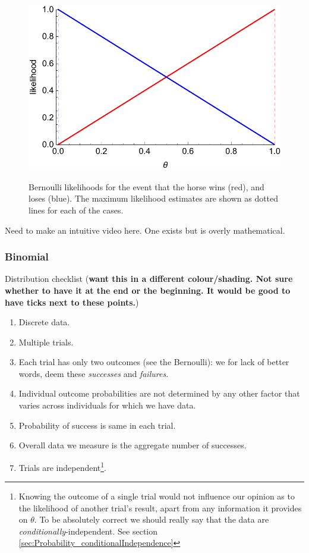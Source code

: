 \documentclass[11pt,fullpage]{book}
\begin{document}
\begin{figure}
\centering
\scalebox{0.5} 
{\includegraphics{Distributions_bernoulliHorseRace.pdf}}
\caption{Bernoulli likelihoods for the event that the horse wins (red), and loses (blue). The maximum likelihood estimates are shown as dotted lines for each of the cases.}\label{fig:Distributions_bernoulliHorseRace}
\end{figure}

 Need to make an intuitive video here. One exists but is overly mathematical.

\subsubsection{Binomial}
Distribution checklist (\textbf{want this in a different colour/shading. Not sure whether to have it at the end or the beginning. It would be good to have ticks next to these points.})

\begin{enumerate} 
\item Discrete data.
\item Multiple trials.
\item Each trial has only two outcomes (see the Bernoulli): we for lack of better words, deem these \textit{successes} and \textit{failures}.
\item Individual outcome probabilities are not determined by any other factor that varies across individuals for which we have data.
\item Probability of success is same in each trial.
\item Overall data we measure is the aggregate number of successes. 
\item Trials are independent\footnote{Knowing the outcome of a single trial would not influence our opinion as to the likelihood of another trial's result, apart from any information it provides on $\theta$. To be absolutely correct we should really say that the data are \textit{conditionally}-independent. See section \ref{sec:Probability_conditionalIndependence}}.
\end{enumerate}
\end{document}
